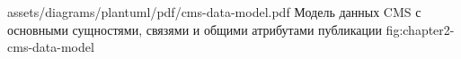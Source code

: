 \appendixdiagram
  {assets/diagrams/plantuml/pdf/cms-data-model.pdf}
  {Модель данных CMS с основными сущностями, связями и общими атрибутами публикации}
  {fig:chapter2-cms-data-model}
